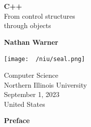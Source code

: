 \documentclass{report}
\title{\Huge{}}
\author{\huge{Nathan Warner}}
\date{\huge{}}
\begin{document}
        \begin{titlepage}
       \begin{center}
           \vspace*{1cm}
    
           \textbf{C++} \\
           From control structures  \\ through objects
    
           \vspace{0.5cm}
            
                
           \vspace{1.5cm}
    
           \textbf{Nathan Warner}
    
           \vfill
                
                
           \vspace{0.8cm}
         
           \texttt{[image: ~/niu/seal.png]}
                
           Computer Science \\
           Northern Illinois University\\
           September 1, 2023 \\
           United States\\
           
                
       \end{center}
    \end{titlepage}
    \tableofcontents
    \pagebreak
    \begin{center}
        \begin{Huge}
           \textbf{Preface} 
        \end{Huge}
    \end{center}
    \bigbreak \noindent 
    
\end{document}
